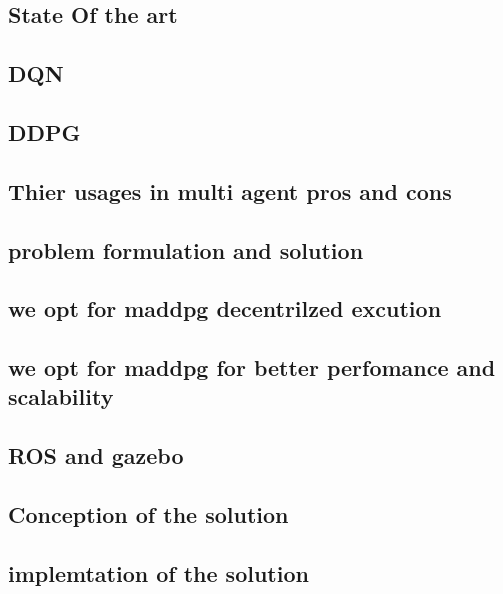 \documentclass[12pt]{article}
\begin{document}
\subsection{State Of the art}
\subsection{DQN}
\subsection{DDPG}
\subsection{Thier usages in multi agent pros and cons}
\subsection{problem formulation and solution}
\subsection{we opt for maddpg decentrilzed excution }
\subsection{we opt for maddpg for better perfomance and scalability }


\subsection{ROS and gazebo}


\subsection{Conception of the solution}


\subsection{implemtation of the solution}











 


\newpage


\end{document}
